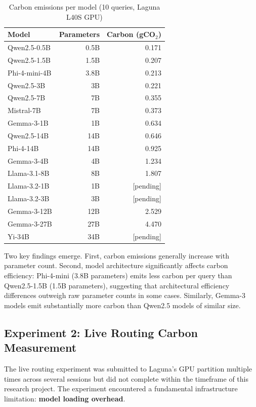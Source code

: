 \documentclass[12pt]{article}
\begin{document}
\begin{table}[H]
\centering
\caption{Carbon emissions per model (10 queries, Laguna L40S GPU)}
\label{tab:permodel}
\begin{tabular}{lrr}
\toprule
\textbf{Model} & \textbf{Parameters} & \textbf{Carbon (gCO$_2$)} \\
\midrule
Qwen2.5-0.5B  & 0.5B  & 0.171 \\
Qwen2.5-1.5B  & 1.5B  & 0.207 \\
Phi-4-mini-4B & 3.8B  & 0.213 \\
Qwen2.5-3B    & 3B    & 0.221 \\
Qwen2.5-7B    & 7B    & 0.355 \\
Mistral-7B    & 7B    & 0.373 \\
Gemma-3-1B    & 1B    & 0.634 \\
Qwen2.5-14B   & 14B   & 0.646 \\
Phi-4-14B     & 14B   & 0.925 \\
Gemma-3-4B    & 4B    & 1.234 \\
Llama-3.1-8B  & 8B    & 1.807 \\
Llama-3.2-1B  & 1B    & [pending] \\
Llama-3.2-3B  & 3B    & [pending] \\
Gemma-3-12B   & 12B   & 2.529 \\
Gemma-3-27B   & 27B   & 4.470 \\
Yi-34B        & 34B   & [pending] \\
\bottomrule
\end{tabular}
\end{table}

Two key findings emerge. First, carbon emissions generally increase with
parameter count. Second, model architecture significantly affects carbon
efficiency: Phi-4-mini (3.8B parameters) emits less carbon per query than
Qwen2.5-1.5B (1.5B parameters), suggesting that architectural efficiency
differences outweigh raw parameter counts in some cases. Similarly, Gemma-3
models emit substantially more carbon than Qwen2.5 models of similar size.

\subsection{Experiment 2: Live Routing Carbon Measurement}

The live routing experiment was submitted to Laguna's GPU partition multiple
times across several sessions but did not complete within the timeframe of
this research project. The experiment encountered a fundamental infrastructure
limitation: \textbf{model loading overhead}.
\end{document}

